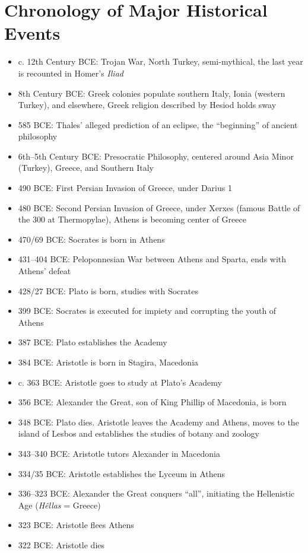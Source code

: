 \documentclass[oneside]{article}
\begin{document}
\section*{Chronology of Major Historical Events}
\begin{itemize}
\item{c. 12th Century BCE: Trojan War, North Turkey,  semi-mythical, the last year is recounted in Homer's \emph{Iliad}}
\item{8th Century BCE: Greek colonies populate southern Italy, Ionia (western Turkey), and elsewhere, Greek religion described by Hesiod holds sway}
\item 585 BCE: Thales' alleged prediction of an eclipse, the ``beginning'' of ancient philosophy
\item{6th--5th Century BCE: Presocratic Philosophy, centered around Asia Minor (Turkey), Greece, and Southern Italy}
\item{490 BCE: First Persian Invasion of Greece, under Darius 1}
\item{480 BCE: Second Persian Invasion of Greece, under Xerxes (famous Battle of the 300 at Thermopylae), Athens is becoming center of Greece}
\item{470/69 BCE: Socrates is born in Athens}
\item{431--404 BCE: Peloponnesian War between Athens and Sparta, ends with Athens' defeat}
\item{428/27 BCE: Plato is born, studies with Socrates}
\item{399 BCE: Socrates is executed for impiety and corrupting the youth of Athens}
\item{387 BCE: Plato establishes the Academy}

\item{384 BCE: Aristotle is born in Stagira, Macedonia}
\item{c. 363 BCE: Aristotle goes to study at Plato's Academy}
\item{356 BCE: Alexander the Great, son of King Phillip of Macedonia, is born}
\item{348 BCE: Plato dies. Aristotle leaves the Academy and Athens, moves to the island of Lesbos and establishes the studies of botany and zoology}
\item{343--340 BCE: Aristotle tutors Alexander in Macedonia}
\item{334/35 BCE: Aristotle establishes the Lyceum in Athens}
\item{336--323 BCE: Alexander the Great conquers ``all'', initiating the Hellenistic Age (\emph{H\^{e}llas} = Greece)}
\item{323 BCE: Aristotle flees Athens }
\item{322 BCE: Aristotle dies}


\end{itemize}
\end{document}
